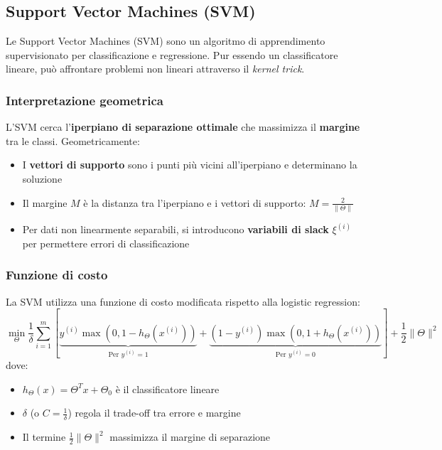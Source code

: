 \documentclass[10pt,oneside,a4paper]{article}
\begin{document}
	\subsection{Support Vector Machines (SVM)}
	Le Support Vector Machines (SVM) sono un algoritmo di apprendimento supervisionato per classificazione e regressione. Pur essendo un classificatore lineare, può affrontare problemi non lineari attraverso il \textit{kernel trick}.
	
	\subsubsection{Interpretazione geometrica}
	L'SVM cerca l'\textbf{iperpiano di separazione ottimale} che massimizza il \textbf{margine} tra le classi. Geometricamente:
	\begin{itemize}
		\item I \textbf{vettori di supporto} sono i punti più vicini all'iperpiano e determinano la soluzione
		\item Il margine $M$ è la distanza tra l'iperpiano e i vettori di supporto: $M = \frac{2}{\|\Theta\|}$
		\item Per dati non linearmente separabili, si introducono \textbf{variabili di slack} $\xi^{(i)}$ per permettere errori di classificazione
	\end{itemize}
	
	\subsubsection{Funzione di costo}
	La SVM utilizza una funzione di costo modificata rispetto alla logistic regression:
	\[
	\min_{\Theta} \frac{1}{\delta} \sum_{i=1}^m \left[
	\underbrace{y^{(i)} \max(0, 1 - h_\Theta(x^{(i)}))}_{\text{Per } y^{(i)}=1} + 
	\underbrace{(1-y^{(i)}) \max(0, 1 + h_\Theta(x^{(i)}))}_{\text{Per } y^{(i)}=0}
	\right] + 
	\frac{1}{2} \|\Theta\|^2
	\]
	dove:
	\begin{itemize}
		\item \( h_\Theta(x) = \Theta^T x + \Theta_0 \) è il classificatore lineare
		\item \( \delta \) (o \( C = \frac{1}{\delta} \)) regola il trade-off tra errore e margine
		\item Il termine \( \frac{1}{2}\|\Theta\|^2 \) massimizza il margine di separazione
	\end{itemize}
	
\end{document}
